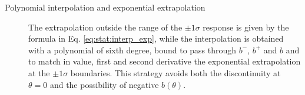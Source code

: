 \begin{description}
\item[Polynomial interpolation and exponential extrapolation] The extrapolation outside the range of the $\pm 1 \sigma$ response is given by the formula in Eq. \ref{eq:stat:interp_exp}, while the interpolation is obtained with a polynomial of sixth degree, bound to pass through $b^-$, $b^+$ and $b$ and to match in value, first and second derivative the exponential extrapolation at the $\pm 1 \sigma$ boundaries. This strategy avoids both the discontinuity at $\theta=0$ and the possibility of negative $b(\theta)$.

\end{description}

\begin{figure}[hbt]
\centering 
{}

\end{figure}
